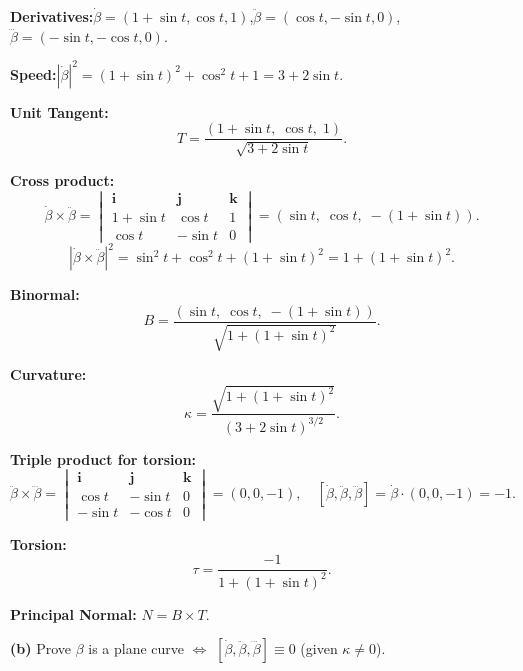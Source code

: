 \documentclass[12pt]{article}
\begin{document}
\begin{ansbox}
\textbf{Derivatives:}\quad $\dot\beta=(1+\sin t,\cos t,1)$,\quad $\ddot\beta=(\cos t,-\sin t,0)$,\quad $\dddot\beta=(-\sin t,-\cos t,0)$.

\medskip
\textbf{Speed:}\quad $|\dot\beta|^2=(1+\sin t)^2+\cos^2t+1=3+2\sin t$.

\medskip
\textbf{Unit Tangent:}
\[
  T=\frac{(1+\sin t,\;\cos t,\;1)}{\sqrt{3+2\sin t}}.
\]

\textbf{Cross product:}
\[
  \dot\beta\times\ddot\beta=\begin{vmatrix}\mathbf{i}&\mathbf{j}&\mathbf{k}\\1+\sin t&\cos t&1\\\cos t&-\sin t&0\end{vmatrix}
  =(\sin t,\;\cos t,\;-(1+\sin t)).
\]
\[
  |\dot\beta\times\ddot\beta|^2=\sin^2t+\cos^2t+(1+\sin t)^2=1+(1+\sin t)^2.
\]

\textbf{Binormal:}
\[
  B=\frac{(\sin t,\;\cos t,\;-(1+\sin t))}{\sqrt{1+(1+\sin t)^2}}.
\]

\textbf{Curvature:}
\[
  \kappa=\frac{\sqrt{1+(1+\sin t)^2}}{(3+2\sin t)^{3/2}}.
\]

\textbf{Triple product for torsion:}
\[
  \ddot\beta\times\dddot\beta=\begin{vmatrix}\mathbf{i}&\mathbf{j}&\mathbf{k}\\\cos t&-\sin t&0\\-\sin t&-\cos t&0\end{vmatrix}=(0,0,-1),
  \quad[\dot\beta,\ddot\beta,\dddot\beta]=\dot\beta\cdot(0,0,-1)=-1.
\]

\textbf{Torsion:}
\[
  \tau=\frac{-1}{1+(1+\sin t)^2}.
\]

\textbf{Principal Normal:} $N=B\times T$.
\end{ansbox}

\vspace{10pt}
\textbf{(b)} Prove $\beta$ is a plane curve $\iff$ $[\dot\beta,\ddot\beta,\dddot\beta]\equiv0$ (given $\kappa\neq0$).
\end{document}

